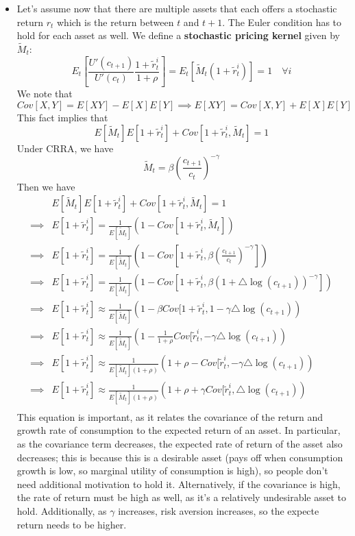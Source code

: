 \documentclass[12pt]{article}
\begin{document}
\begin{itemize}
    \item Let's assume now that there are multiple assets that each offers a stochastic return $r_t$ which is the return between $t$ and $t+1$. The Euler condition has to hold for each asset as well. We define a \textbf{stochastic pricing kernel} given by $\widetilde{M}_t$:
    \[E_t\left[\frac{U'(c_{t+1})}{U'(c_t)}\frac{1+\widetilde{r}_t^i}{1+\rho}\right] = E_t\left[\widetilde{M}_t\left(1+\widetilde{r}_t^i\right)\right] = 1 \quad \forall i\]
    We note that 
    \[Cov[X,Y] = E[XY] - E[X]E[Y] \implies E[XY] = Cov[X,Y] + E[X]E[Y]\]
    This fact implies that
    \[E[\widetilde{M}_t]E[1+\widetilde{r}_t^i] + Cov[1+\widetilde{r}_t^i, \widetilde{M}_t] = 1\]
    Under CRRA, we have
    \[\widetilde{M}_t = \beta \left(\frac{c_{t+1}}{c_t}\right)^{-\gamma}\]
    Then we have
    \[\begin{split}
        &E[\widetilde{M}_t]E[1+\widetilde{r}_t^i] + Cov[1+\widetilde{r}_t^i, \widetilde{M}_t] = 1 \\
        \implies &E[1+\widetilde{r}_t^i] = \frac{1}{E[\widetilde{M}_t]}\left(1 - Cov[1+\widetilde{r}_t^i, \widetilde{M}_t]\right)\\
        \implies &E[1+\widetilde{r}_t^i] = \frac{1}{E[\widetilde{M}_t]}\left(1 - Cov\left[1+\widetilde{r}_t^i, \beta \left(\frac{c_{t+1}}{c_t}\right)^{-\gamma}\right]\right)\\
        \implies &E[1+\widetilde{r}_t^i] = \frac{1}{E[\widetilde{M}_t]}\left(1 - Cov\left[1+\widetilde{r}_t^i, \beta \left(1 + \triangle \log(c_{t+1})\right)^{-\gamma}\right]\right)\\
        \implies &E[1+\widetilde{r}_t^i] \approx \frac{1}{E[\widetilde{M}_t]}\left(1 - \beta Cov[1+\widetilde{r}_t^i,  1-\gamma \triangle \log(c_{t+1})\right)\\
        \implies &E[1+\widetilde{r}_t^i] \approx \frac{1}{E[\widetilde{M}_t]}\left(1 - \frac{1}{1+\rho} Cov[\widetilde{r}_t^i, -\gamma \triangle \log(c_{t+1})\right)\\
        \implies &E[1+\widetilde{r}_t^i] \approx \frac{1}{E[\widetilde{M}_t](1+\rho)}\left(1+\rho -Cov[\widetilde{r}_t^i, -\gamma \triangle \log(c_{t+1})\right)\\
        \implies &E[1+\widetilde{r}_t^i] \approx \frac{1}{E[\widetilde{M}_t](1+\rho)}\left(1+\rho +\gamma Cov[\widetilde{r}_t^i, \triangle \log(c_{t+1})\right)\\
    \end{split}\]
    This equation is important, as it relates the covariance of the return and growth rate of consumption to the expected return of an asset. In particular, as the covariance term decreases, the expected rate of return of the asset also decreases; this is because this is a desirable asset (pays off when consumption growth is low, so marginal utility of consumption is high), so people don't need additional motivation to hold it. Alternatively, if the covariance is high, the rate of return must be high as well, as it's a relatively undesirable asset to hold. Additionally, as $\gamma$ increases, risk aversion increases, so the expecte return needs to be higher.

\end{itemize}
\end{document}
